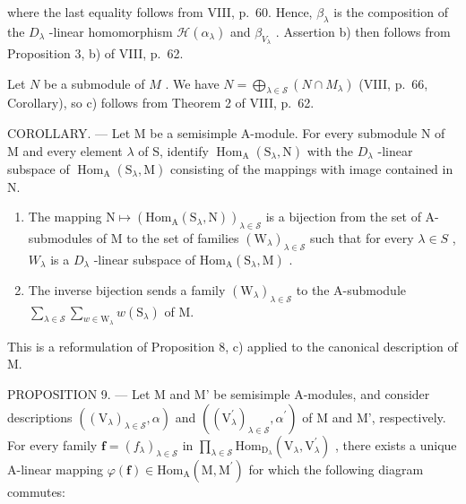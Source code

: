 where the last equality follows from VIII, p.~60. Hence, \(\beta_{\lambda}\) is the composition of the \(D_{\lambda}\) -linear homomorphism \(\mathcal{H}(\alpha_{\lambda})\) and \(\beta_{V_{\lambda}}\) . Assertion b) then follows from Proposition 3, b) of VIII, p.~62.

Let \(N\) be a submodule of \(M\) . We have \(N = \bigoplus_{\lambda \in \mathcal{S}} (N \cap M_{\lambda})\) (VIII, p.~66, Corollary), so c) follows from Theorem 2 of VIII, p.~62.

COROLLARY. --- Let M be a semisimple A-module. For every submodule N of M and every element \(\lambda\) of S, identify \(\operatorname{Hom}_{\mathrm{A}}(\mathrm{S}_{\lambda},\mathrm{N})\) with the \(D_{\lambda}\) -linear subspace of \(\operatorname{Hom}_{\mathrm{A}}(\mathrm{S}_{\lambda},\mathrm{M})\) consisting of the mappings with image contained in N.

\begin{enumerate}
\def\labelenumi{\alph{enumi})}
\item
  The mapping \(\mathrm{N}\mapsto(\mathrm{Hom}_{\mathrm{A}}(\mathrm{S}_{\lambda},\mathrm{N}))_{\lambda\in\mathcal{S}}\) is a bijection from the set of A-submodules of M to the set of families \((\mathrm{W}_{\lambda})_{\lambda\in\mathcal{S}}\) such that for every \(\lambda\in S\) , \(W_{\lambda}\) is a \(D_{\lambda}\) -linear subspace of \(\mathrm{Hom}_{\mathrm{A}}(\mathrm{S}_{\lambda},\mathrm{M})\) .
\item
  The inverse bijection sends a family \((\mathrm{W}_{\lambda})_{\lambda \in \mathcal{S}}\) to the A-submodule \(\sum_{\lambda \in \mathcal{S}}\sum_{w\in \mathrm{W}_{\lambda}}w(\mathrm{S}_{\lambda})\) of M.
\end{enumerate}

This is a reformulation of Proposition 8, c) applied to the canonical description of M.

PROPOSITION 9. --- Let M and M' be semisimple A-modules, and consider descriptions \(((\mathrm{V}_{\lambda})_{\lambda\in\mathcal{S}},\alpha)\) and \(((\mathrm{V}_{\lambda}^{\prime})_{\lambda\in\mathcal{S}},\alpha^{\prime})\) of M and M', respectively. For every family \(\boldsymbol{f}=(f_{\lambda})_{\lambda\in\mathcal{S}}\) in \(\prod_{\lambda\in\mathcal{S}}\mathrm{Hom}_{\mathrm{D}_{\lambda}}(\mathrm{V}_{\lambda},\mathrm{V}_{\lambda}^{\prime})\) , there exists a unique A-linear mapping \(\varphi(\boldsymbol{f})\in\mathrm{Hom}_{\mathrm{A}}(\mathrm{M},\mathrm{M}^{\prime})\) for which the following diagram commutes:

